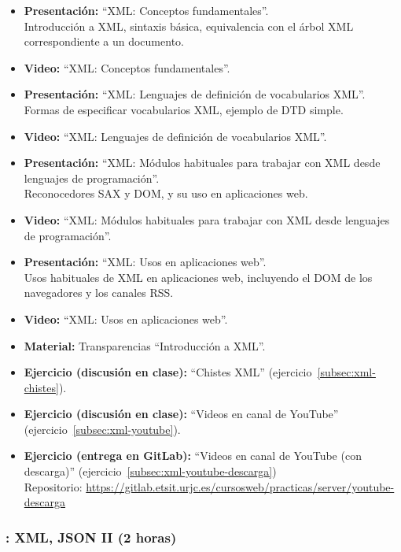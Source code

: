 \documentclass[a4paper,12pt]{article}
\begin{document}
\begin{itemize}
\item \textbf{Presentación:} ``XML: Conceptos fundamentales''. \\
  Introducción a XML, sintaxis básica, equivalencia con el árbol XML correspondiente a un documento.
\item \textbf{Video:} ``XML: Conceptos fundamentales''.

\item \textbf{Presentación:} ``XML: Lenguajes de definición de vocabularios XML''. \\
  Formas de especificar vocabularios XML, ejemplo de DTD simple.
\item \textbf{Video:} ``XML: Lenguajes de definición de vocabularios XML''.
\item \textbf{Presentación:} ``XML: Módulos habituales para trabajar con XML desde lenguajes de programación''. \\
  Reconocedores SAX y DOM, y su uso en aplicaciones web.
\item \textbf{Video:} ``XML: Módulos habituales para trabajar con XML desde lenguajes de programación''.
\item \textbf{Presentación:} ``XML: Usos en aplicaciones web''. \\
  Usos habituales de XML en aplicaciones web, incluyendo el DOM de los navegadores y los canales RSS.
\item \textbf{Video:} ``XML: Usos en aplicaciones web''.
\item \textbf{Material:} Transparencias ``Introducción a XML''.
\item \textbf{Ejercicio (discusión en clase):} ``Chistes XML'' (ejercicio~\ref{subsec:xml-chistes}).
\item \textbf{Ejercicio (discusión en clase):} ``Videos en canal de YouTube'' (ejercicio~\ref{subsec:xml-youtube}).
\item \textbf{Ejercicio (entrega en GitLab):} ``Videos en canal de YouTube (con descarga)'' (ejercicio~\ref{subsec:xml-youtube-descarga}) \\
  Repositorio: \url{https://gitlab.etsit.urjc.es/cursosweb/practicas/server/youtube-descarga}
\end{itemize}

\subsubsection{\martesL: XML, JSON II (2 horas)}
\label{cal:martesL}
\end{document}
